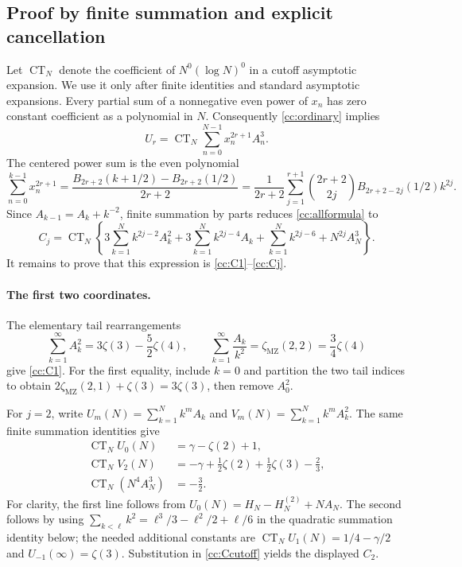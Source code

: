 \documentclass[11pt,letterpaper]{article}
\theoremstyle{definition}
\theoremstyle{remark}
\numberwithin{equation}{section}
\begin{document}
\subsection{Proof by finite summation and explicit cancellation}

Let $\operatorname{CT}_N$ denote the coefficient of
$N^0(\log N)^0$ in a cutoff asymptotic expansion.  We use it only
after finite identities and standard asymptotic expansions.
Every partial sum of a nonnegative even power of $x_n$ has zero
constant coefficient as a polynomial in $N$.  Consequently
\eqref{cc:ordinary} implies
\begin{equation}\label{cc:cutoff}
 U_r=\operatorname{CT}_N\sum_{n=0}^{N-1}x_n^{2r+1}A_n^3.
\end{equation}
The centered power sum is the even polynomial
\begin{equation}\label{cc:centeredsum}
 \sum_{n=0}^{k-1}x_n^{2r+1}
 =\frac{B_{2r+2}(k+1/2)-B_{2r+2}(1/2)}{2r+2}
 =\frac1{2r+2}\sum_{j=1}^{r+1}
      \binom{2r+2}{2j}B_{2r+2-2j}(1/2)k^{2j}.
\end{equation}
Since $A_{k-1}=A_k+k^{-2}$, finite summation by parts reduces
\eqref{cc:allformula} to
\begin{equation}\label{cc:Ccutoff}
 C_j=\operatorname{CT}_N\left\{
 3\sum_{k=1}^Nk^{2j-2}A_k^2
 +3\sum_{k=1}^Nk^{2j-4}A_k
 +\sum_{k=1}^Nk^{2j-6}+N^{2j}A_N^3\right\}.
\end{equation}
It remains to prove that this expression is
\eqref{cc:C1}--\eqref{cc:Cj}.

\paragraph{The first two coordinates.}
The elementary tail rearrangements
\[
 \sum_{k=1}^{\infty}A_k^2=3\zeta(3)-\frac52\zeta(4),\qquad
 \sum_{k=1}^{\infty}\frac{A_k}{k^2}=\zeta_{\mathrm{MZ}}(2,2)=\frac34\zeta(4)
\]
give \eqref{cc:C1}.  For the first equality, include $k=0$ and
partition the two tail indices to obtain
$2\zeta_{\mathrm{MZ}}(2,1)+\zeta(3)=3\zeta(3)$, then remove $A_0^2$.

For $j=2$, write
$U_m(N)=\sum_{k=1}^Nk^mA_k$ and
$V_m(N)=\sum_{k=1}^Nk^mA_k^2$.
The same finite summation identities give
\begin{align*}
 \operatorname{CT}_N U_0(N)&=\gamma-\zeta(2)+1,\\
 \operatorname{CT}_N V_2(N)&=-\gamma+\frac12\zeta(2)
                         +\frac12\zeta(3)-\frac23,\\
 \operatorname{CT}_N(N^4A_N^3)&=-\frac32.
\end{align*}
For clarity, the first line follows from
$U_0(N)=H_N-H_N^{(2)}+NA_N$.
The second follows by using
$\sum_{k<\ell}k^2=\ell^3/3-\ell^2/2+\ell/6$ in the
quadratic summation identity below; the needed additional constants are
$\operatorname{CT}_NU_1(N)=1/4-\gamma/2$ and
$U_{-1}(\infty)=\zeta(3)$.
Substitution in \eqref{cc:Ccutoff} yields the displayed $C_2$.
\end{document}
